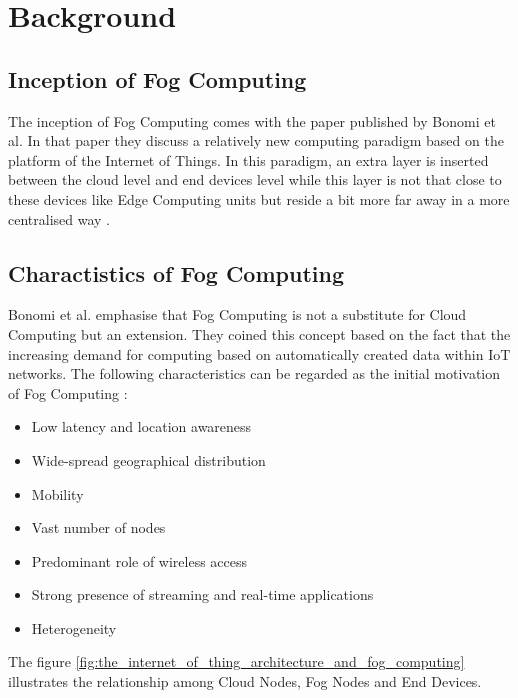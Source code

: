 \chapter{Background} \label{chap:background}

\section{Inception of Fog Computing}
The inception of Fog Computing comes with the paper published by Bonomi et al. In that paper they discuss a relatively new computing paradigm based on the platform of the Internet of Things. In this paradigm, an extra layer is inserted between the cloud level and end devices level while this layer is not that close to these devices like Edge Computing units but reside a bit more far away in a more centralised way \cite{roman2018mobile}.


\section{Charactistics of Fog Computing}
Bonomi et al. emphasise that Fog Computing is not a substitute for Cloud Computing but an extension. They coined this concept based on the fact that the increasing demand for computing based on automatically created data within IoT networks. The following characteristics can be regarded as the initial motivation of Fog Computing \cite{bonomi2012fog}:
\begin{itemize}
    \item Low latency and location awareness
    \item Wide-spread geographical distribution
    \item Mobility
    \item Vast number of nodes
    \item Predominant role of wireless access
    \item Strong presence of streaming and real-time applications
    \item Heterogeneity
\end{itemize}

The figure \ref{fig:the_internet_of_thing_architecture_and_fog_computing} illustrates the relationship among Cloud Nodes, Fog Nodes and End Devices.

